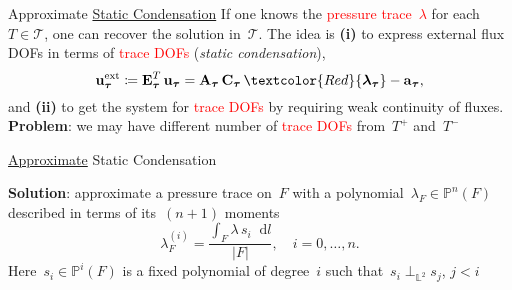 \documentclass[svgnames]{beamer} %
\newcommand{\svginputw}[2][\linewidth]{\def\svgwidth{#1}} %
\newcommand{\vect}[1]{\boldsymbol{\mathbf{#1}}}
\newcommand{\bmesh}{{\vect{\mathcal T}}}
\newcommand{\mmesh}{{\vect{\mathcal \tau}}}
\newcommand{\bfaces}[1][]{{\vect{\mathcal F}_{\text{#1}}}}
\newcommand{\mfaces}[1][]{{\vect{\mathcal f}_{\text{#1}}}}
\newcommand{\LTwo}{{\mathbb L^2}}
\newcommand{\PnSpace}[2]{{\mathbb P^{#1}\left({#2}\right)}}
\newcommand*\diff{\mathop{}\!\mathrm{d}}
\begin{document}
	\begin{frame}{Approximate \ul{Static Condensation}}
		If one knows the \textcolor{Red}{pressure trace~$\lambda$} for each~$T \in \bmesh$, one can recover the solution in~$\bmesh$. The idea is \textbf{(i)} to express external flux DOFs in terms of \textcolor{Red}{trace DOFs} (\textit{static condensation}),
		$$
			\vect u^\text{ext}_\mmesh \coloneqq \vect E_\mmesh^T\,\vect u_\mmesh = \vect A_\mmesh\,\vect C_\mmesh\,\textcolor{Red}{\vect \lambda_\mmesh} - \vect a_\mmesh,
		$$
		and \textbf{(ii)} to get the system for \textcolor{Red}{trace DOFs} by requiring weak continuity of fluxes. 
		\textbf{Problem}: we may have different number of \textcolor{Red}{trace DOFs} from~$T^+$ and~$T^-$	
		\begin{figure}
			\centering
			\svginputw[.6\linewidth]{e_plus_e_minus.pdf_tex}
		\end{figure}
	\end{frame}

	\begin{frame}{\ul{Approximate} Static Condensation}
		\begin{figure}
			\centering
			\svginputw[.6\linewidth]{e_plus_e_minus.pdf_tex}
		\end{figure}
		\textbf{Solution}: approximate a pressure trace on~$F$ with a polynomial~$\lambda_F \in \PnSpace{n}{F}$ described in terms of its~$(n+1)$ moments
		\begin{equation*}
			\lambda^{(i)}_F=\frac{\int_F  \lambda\,s_i \diff l}{|F|}, \quad i = 0, \dots, n.
		\end{equation*}
		Here~$s_i \in \PnSpace{i}{F}$ is a fixed polynomial of degree~$i$ such that~$s_i \perp_\LTwo s_j$, $j < i$
	\end{frame}
\end{document}
